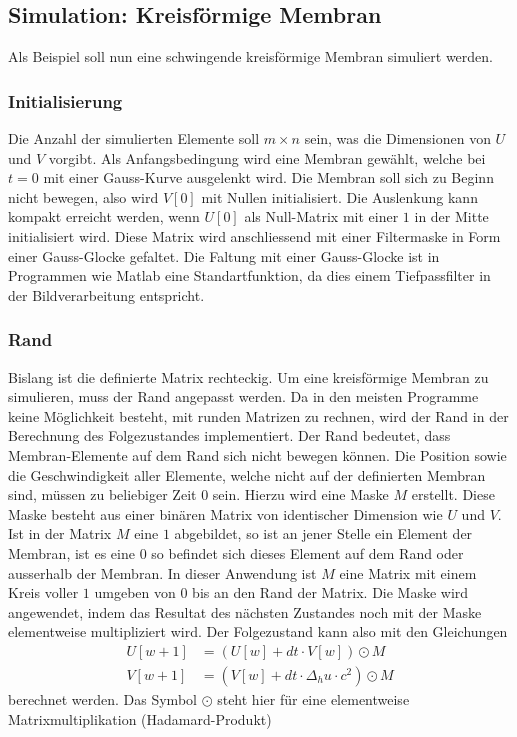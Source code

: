 \subsection{Simulation: Kreisförmige Membran}
Als Beispiel soll nun eine schwingende kreisförmige Membran simuliert werden.
\subsubsection{Initialisierung}
Die Anzahl der simulierten Elemente soll $ m \times n $ sein, was die Dimensionen von $ U $ und $ V $ vorgibt.
Als Anfangsbedingung wird eine Membran gewählt, welche bei $ t=0 $ mit einer Gauss-Kurve ausgelenkt wird.
Die Membran soll sich zu Beginn nicht bewegen, also wird $ V[0] $ mit Nullen initialisiert.
Die Auslenkung kann kompakt erreicht werden, wenn $ U[0] $ als Null-Matrix mit einer $ 1 $ in der Mitte initialisiert wird. 
Diese Matrix wird anschliessend mit einer Filtermaske in Form einer Gauss-Glocke gefaltet.
Die Faltung mit einer Gauss-Glocke ist in Programmen wie Matlab eine Standartfunktion, da dies einem Tiefpassfilter in der Bildverarbeitung entspricht.

\subsubsection{Rand}
Bislang ist die definierte Matrix rechteckig.
Um eine kreisförmige Membran zu simulieren, muss der Rand angepasst werden.
Da in den meisten Programme keine Möglichkeit besteht, mit runden Matrizen zu rechnen, wird der Rand in der Berechnung des Folgezustandes implementiert.
Der Rand bedeutet, dass Membran-Elemente auf dem Rand sich nicht
bewegen können.
Die Position sowie die Geschwindigkeit aller Elemente, welche nicht
auf der definierten Membran sind, müssen zu beliebiger Zeit $0$ sein.
Hierzu wird eine Maske $M$ erstellt. 
Diese Maske besteht aus einer binären Matrix von identischer Dimension
wie $ U $ und $ V $. 
Ist in der Matrix $M$ eine $1$ abgebildet, so ist an jener Stelle ein Element der Membran, ist es eine $0$ so befindet sich dieses Element auf dem Rand oder ausserhalb der Membran.
In dieser Anwendung ist $M$ eine Matrix mit einem Kreis voller $1$ umgeben von $0$ bis an den Rand der Matrix.
Die Maske wird angewendet, indem das Resultat des nächsten Zustandes noch mit der Maske elementweise multipliziert wird. 
Der Folgezustand kann also mit den Gleichungen
\begin{align}
	\label{kreismembran:eq:folge_U} 
	U[w+1] &= (U[w] + dt \cdot V[w])\odot M\\
	\label{kreismembran:eq:folge_V}
	V[w+1] &= (V[w] + dt \cdot \Delta_h u \cdot c^2)\odot M
\end{align}
berechnet werden.
Das Symbol $\odot$ steht hier für eine elementweise Matrixmultiplikation
(Hadamard-Produkt)
%

